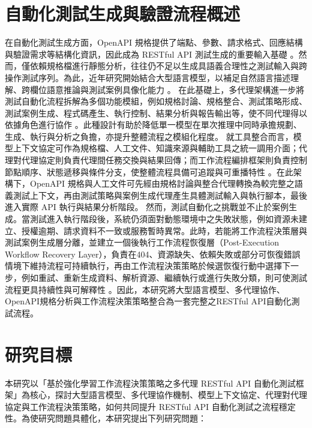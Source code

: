 \begin{ZhChapter}
\section{自動化測試生成與驗證流程概述}
\text 在自動化測試生成方面，OpenAPI 規格提供了端點、參數、請求格式、回應結構與驗證需求等結構化資訊，因此成為 RESTful API 測試生成的重要輸入基礎 \parencite{Nguyen2024KAT, Wang2020AutomaticGeneration}。然而，僅依賴規格檔進行靜態分析，往往仍不足以生成具語義合理性之測試輸入與跨操作測試序列。為此，近年研究開始結合大型語言模型，以補足自然語言描述理解、跨欄位語意推論與測試案例具像化能力 \parencite{Wang2024Software, Golmohammadi2024Testing}。
\text 在此基礎上，多代理架構進一步將測試自動化流程拆解為多個功能模組，例如規格討論、規格整合、測試策略形成、測試案例生成、程式碼產生、執行控制、結果分析與報告輸出等，使不同代理得以依據角色進行協作 \parencite{Anonymous2023LLMGenerators, Bandi2025Rise}。此種設計有助於降低單一模型在單次推理中同時承擔規劃、生成、執行與分析之負擔，亦提升整體流程之模組化程度。
\text 就工具整合而言，模型上下文協定可作為規格檔、人工文件、知識來源與輔助工具之統一調用介面；代理對代理協定則負責代理間任務交換與結果回傳；而工作流程編排框架則負責控制節點順序、狀態遞移與條件分支，使整體流程具備可追蹤與可重播特性 \parencite{Hou2025MCP, Borghoff2025Beyond, Sarkar2025Survey}。在此架構下，OpenAPI 規格與人工文件可先經由規格討論與整合代理轉換為較完整之語義測試上下文，再由測試策略與案例生成代理產生具體測試輸入與執行腳本，最後進入實際 API 執行與結果分析階段。
\text 然而，測試自動化之挑戰並不止於案例生成。當測試進入執行階段後，系統仍須面對動態環境中之失敗狀態，例如資源未建立、授權逾期、請求資料不一致或服務暫時異常。此時，若能將工作流程決策層與測試案例生成層分離，並建立一個後執行工作流程恢復層（Post-Execution Workflow Recovery Layer），負責在404、資源缺失、依賴失敗或部分可恢復錯誤情境下維持流程可持續執行，再由工作流程決策策略於候選恢復行動中選擇下一步，例如重試、重新生成資料、解析資源、繼續執行或進行失敗分類，則可使測試流程更具持續性與可解釋性 \parencite{Gu2026Large, Takerngsaksiri2025Pytester}。因此，本研究將大型語言模型、多代理協作、OpenAPI規格分析與工作流程決策策略整合為一套完整之RESTful API自動化測試流程。

\section{研究目標}
\text 本研究以「基於強化學習工作流程決策策略之多代理 RESTful API 自動化測試框架」為核心，探討大型語言模型、多代理協作機制、模型上下文協定、代理對代理協定與工作流程決策策略，如何共同提升 RESTful API 自動化測試之流程穩定性。為使研究問題具體化，本研究提出下列研究問題：


\end{ZhChapter}
